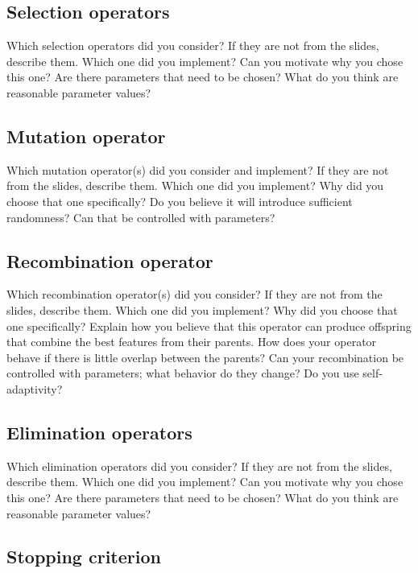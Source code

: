 \documentclass[a4paper,10pt]{article}
\newcommand{\ReplaceMe}[1]{{\color{blue}#1}}
\begin{document}
\subsection{Selection operators}

\ReplaceMe{Which selection operators did you consider? If they are not from the slides, describe them. Which one did you implement? Can you motivate why you chose this one? Are there parameters that need to be chosen? What do you think are reasonable parameter values?}

\subsection{Mutation operator}

\ReplaceMe{Which mutation operator(s) did you consider and implement? If they are not from the slides, describe them. Which one did you implement? Why did you choose that one specifically? Do you believe it will introduce sufficient randomness? Can that be controlled with parameters?}

\subsection{Recombination operator}

\ReplaceMe{Which recombination operator(s) did you consider? If they are not from the slides, describe them. Which one did you implement? Why did you choose that one specifically? Explain how you believe that this operator can produce offspring that combine the best features from their parents. How does your operator behave if there is little overlap between the parents? Can your recombination be controlled with parameters; what behavior do they change? Do you use self-adaptivity?}

\subsection{Elimination operators}

\ReplaceMe{Which elimination operators did you consider? If they are not from the slides, describe them. Which one did you implement? Can you motivate why you chose this one? Are there parameters that need to be chosen? What do you think are reasonable parameter values?} 

\subsection{Stopping criterion}
\end{document}
